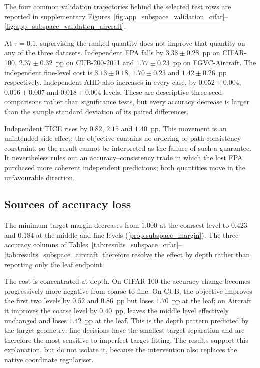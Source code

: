 The four common validation trajectories behind the selected test rows are
reported in supplementary
Figures~\ref{fig:app_subspace_validation_cifar}--\ref{fig:app_subspace_validation_aircraft}.

At $\tau=0.1$, supervising the ranked quantity does not improve that quantity on
any of the three datasets. Independent FPA falls by $3.38\pm0.28$~pp on
CIFAR-100, $2.37\pm0.32$~pp on CUB-200-2011 and $1.77\pm0.23$~pp on
FGVC-Aircraft. The independent fine-level cost is $3.13\pm0.18$,
$1.70\pm0.23$ and
$1.42\pm0.26$~pp respectively. Independent AHD also increases in every case,
by $0.052\pm0.004$, $0.016\pm0.007$ and $0.018\pm0.004$ levels. These are
descriptive three-seed comparisons rather than significance tests, but every
accuracy decrease is larger than the sample standard deviation of its paired
differences.

Independent TICE rises by $0.82$, $2.15$ and $1.40$~pp. This movement is an
unintended side effect: the objective contains no ordering or path-consistency
constraint, so the result cannot be interpreted as the failure of such a
guarantee. It nevertheless rules out an accuracy--consistency trade in which
the lost FPA purchased more coherent independent predictions; both quantities
move in the unfavourable direction.

\subsection{Sources of accuracy loss}
\label{ssec:results_subspace_depth}

The minimum target margin decreases from $1.000$ at the coarsest level to
$0.423$ and $0.184$ at the middle and fine levels
(\cref{prop:subspace_margin}).
The three accuracy columns of
Tables~\ref{tab:results_subspace_cifar}--\ref{tab:results_subspace_aircraft}
therefore resolve the effect by depth rather than reporting only the leaf
endpoint.

The cost is concentrated at depth. On CIFAR-100 the accuracy change becomes
progressively more negative from coarse to fine. On CUB, the objective improves
the first two levels by $0.52$ and $0.86$~pp but loses $1.70$~pp at the leaf;
on Aircraft it improves the coarse level by $0.40$~pp, leaves the middle level
effectively unchanged and loses $1.42$~pp at the leaf. This is the depth pattern
predicted by the target geometry: fine decisions have the smallest target
separation and are therefore the most sensitive to imperfect target fitting.
The results support this explanation, but do not isolate it, because the
intervention also replaces the native coordinate regulariser.


